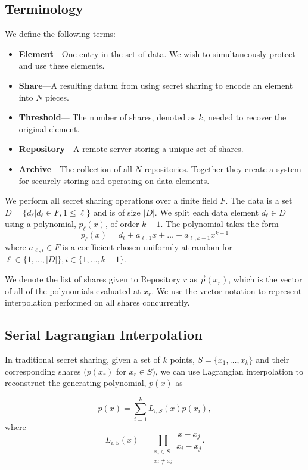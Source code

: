 \subsection{Terminology}\label{ssec:sif:terminology}
We define the following terms:

\begin{itemize}
\item {\bf Element}---One entry in the set of data. We wish to simultaneously
protect and use these elements.
\item {\bf Share}---A resulting datum from using secret sharing to encode an
  element into $N$ pieces.
\item {\bf Threshold}--- The number of shares, denoted as $k$, needed to recover the original
  element.
\item {\bf Repository}---A remote server storing a unique set of shares.
\item {\bf Archive}---The collection of all $N$ repositories. Together they
  create a system for securely storing and operating on data elements.
\end{itemize}

We perform all secret sharing operations over a finite field $F$.
The data is a set $D = \{d_\ell | d_\ell\in F, 1 \leq \ell\}$ and is of size $|D|$.
We split each data element $d_\ell \in D$ using a polynomial,
$p_\ell(x)$, of order $k-1$.  The polynomial takes the form
\[
p_{\ell}(x) = d_{\ell} + a_{\ell, 1} x + \dots + a_{\ell, k -1} x^{k-1}
\]
where $a_{\ell, i} \in F$ is a coefficient chosen uniformly at random for
$\ell\in\{1,\ldots,|D|\}, i \in \{1,\ldots,k-1\}$. 

We denote the list of shares given to Repository $r$ as
$\vec{p}(x_r)$, which is the vector of all of the polynomials
evaluated at $x_r$.  We use the vector notation to represent
interpolation performed on all shares concurrently.

\subsection{Serial Lagrangian Interpolation}\label{ssec:sif:sli}

In traditional secret sharing,
given a set of $k$ points, $S= \{x_1,\dots,x_k\}$ and their
corresponding shares ($p(x_r)$ for $x_r \in S$), we can use
Lagrangian interpolation to reconstruct the generating polynomial,
$p(x)$ as

\[
p(x) = \sum_{i=1}^{k}L_{i,S}(x)p(x_i),
\]
where
\[
L_{i,S}(x) = \!\prod\limits_{\substack{x_j \in S \\ x_j \neq x_i}}\! \frac{x-x_j}{x_i-x_j}.
\]

